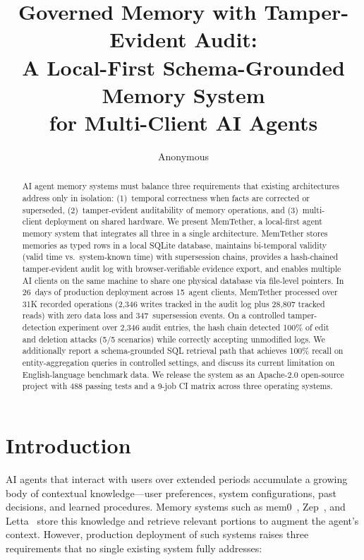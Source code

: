 ﻿\documentclass{article}
\title{Governed Memory with Tamper-Evident Audit:\\ A Local-First Schema-Grounded Memory System\\ for Multi-Client AI Agents}
\author{Anonymous}
\date{}
\begin{document}
\maketitle

\begin{abstract}
AI agent memory systems must balance three requirements that existing architectures address only in isolation: (1)~temporal correctness when facts are corrected or superseded, (2)~tamper-evident auditability of memory operations, and (3)~multi-client deployment on shared hardware. We present MemTether, a local-first agent memory system that integrates all three in a single architecture. MemTether stores memories as typed rows in a local SQLite database, maintains bi-temporal validity (valid time vs.\ system-known time) with supersession chains, provides a hash-chained tamper-evident audit log with browser-verifiable evidence export, and enables multiple AI clients on the same machine to share one physical database via file-level pointers. In 26~days of production deployment across 15~agent clients, MemTether processed over 31K recorded operations (2{,}346 writes tracked in the audit log plus 28{,}807 tracked reads) with zero data loss and 347~supersession events. On a controlled tamper-detection experiment over 2{,}346 audit entries, the hash chain detected 100\% of edit and deletion attacks (5/5 scenarios) while correctly accepting unmodified logs. We additionally report a schema-grounded SQL retrieval path that achieves 100\% recall on entity-aggregation queries in controlled settings, and discuss its current limitation on English-language benchmark data. We release the system as an Apache-2.0 open-source project with 488 passing tests and a 9-job CI matrix across three operating systems.
\end{abstract}

\section{Introduction}
\label{sec:intro}

AI agents that interact with users over extended periods accumulate a growing body of contextual knowledge---user preferences, system configurations, past decisions, and learned procedures. Memory systems such as mem0~\citep{mem0}, Zep~\citep{zep}, and Letta~\citep{letta} store this knowledge and retrieve relevant portions to augment the agent's context. However, production deployment of such systems raises three requirements that no single existing system fully addresses:
\end{document}
